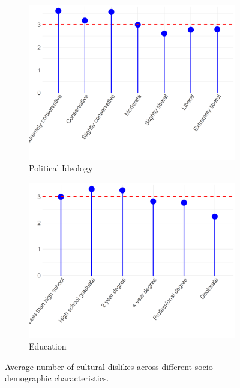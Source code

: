 \documentclass[12pt]{article}
\begin{document}
\begin{figure}[ht!]
    \captionsetup[subfigure]{font=footnotesize,labelfont=footnotesize}
    \centering
     \begin{subfigure}[b]{0.3\textwidth}
        \includegraphics[width=1.0\textwidth]{Plots/uni-dist-grd-int-pol.png}
            \caption{Political Ideology}
            \label{fig:grd-int-pol}
    \end{subfigure}
     \begin{subfigure}[b]{0.3\textwidth}
        \includegraphics[width=1.0\textwidth]{Plots/uni-dist-grd-int-edu.png}
            \caption{Education}
            \label{fig:grd-int-edu}
    \end{subfigure}
    \caption{Average number of cultural dislikes across different socio-demographic characteristics.}
    \label{fig:grd-int}
\end{figure}

\newpage


\end{document}
